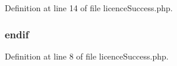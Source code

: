 Definition at line 14 of file licence\-Success.\-php.

\hypertarget{licence_success_8php_a82cd33ca97ff99f2fcc5e9c81d65251b}{
\subsubsection[{endif}]{\setlength{\rightskip}{0pt plus 5cm}endif}}\label{licence_success_8php_a82cd33ca97ff99f2fcc5e9c81d65251b}


Definition at line 8 of file licence\-Success.\-php.

